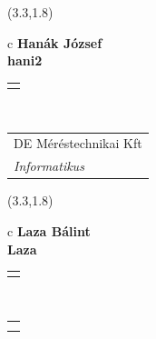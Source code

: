 \documentclass[11pt]{article}
\begin{document}
\makebox(3.3,1.8){
  \renewcommand\arraystretch{1.3}
  \begin{tabular}[c]{c}
    \hspace{8.5mm}
    \LARGE\bf{ Hanák József }\\
    \hspace{8.5mm}
    \Large{ hani2 }\\
    \renewcommand\arraystretch{3}
    \begin{tabular}[c]{c}
      \centering
      \fontfamily{phv}\selectfont{
        \textbf{
          \textsc{
            \scriptsize{
            \color{Dark}{ Ismerkedő }\color{Bright}{ Webmester }\color{Bright}{ Sminkmester }\color{Bright}{ Programozó }
            }
          }
        }
      }
    \end{tabular}
    \\
    \renewcommand\arraystretch{1}
    \begin{tabular}{p{3.3in}}
      \hspace{.7cm}DE Méréstechnikai Kft\\
      \hspace{.7cm}\emph{ Informatikus }\\
    \end{tabular}
  \end{tabular}
}

\makebox(3.3,1.8){
  \renewcommand\arraystretch{1.3}
  \begin{tabular}[c]{c}
    \hspace{8.5mm}
    \LARGE\bf{ Laza Bálint }\\
    \hspace{8.5mm}
    \Large{ Laza }\\
    \renewcommand\arraystretch{3}
    \begin{tabular}[c]{c}
      \centering
      \fontfamily{phv}\selectfont{
        \textbf{
          \textsc{
            \scriptsize{
            \color{Bright}{ Ismerkedő }\color{Dark}{ Webmester }\color{Bright}{ Sminkmester }\color{Dark}{ Programozó }
            }
          }
        }
      }
    \end{tabular}
    \\
    \renewcommand\arraystretch{1}
    \begin{tabular}{p{3.3in}}
      \hspace{.7cm}\\
      \hspace{.7cm}\emph{  }\\
    \end{tabular}
  \end{tabular}
}
\end{document}
